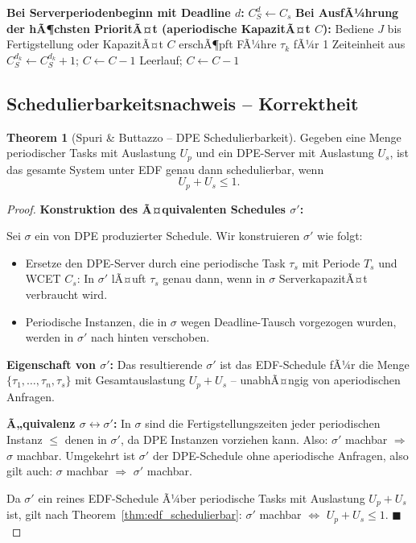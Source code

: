 ﻿\documentclass[a4paper,12pt]{report}
\theoremstyle{definition}
\newtheorem{theorem}{Theorem}[chapter]
\begin{document}
\begin{algorithm}[H]
	\caption{DPE Server -- Ereignisbehandlung}
	\begin{algorithmic}[1]
		\State \textbf{Bei Serverperiodenbeginn mit Deadline $d$:}
		\State $C_S^d \leftarrow C_s$
		\State
		\State \textbf{Bei AusfÃ¼hrung der hÃ¶chsten PrioritÃ¤t (aperiodische KapazitÃ¤t $C$):}
		\State Bediene $J$ bis Fertigstellung oder KapazitÃ¤t $C$ erschÃ¶pft
		\State FÃ¼hre $\tau_k$ fÃ¼r 1 Zeiteinheit aus
		\State $C_S^{d_k} \leftarrow C_S^{d_k} + 1$; $C \leftarrow C - 1$
		\Else
		\State Leerlauf; $C \leftarrow C - 1$
		\EndIf
	\end{algorithmic}
\end{algorithm}

\subsection{Schedulierbarkeitsnachweis -- Korrektheit}

\begin{theorem}[Spuri \& Buttazzo -- DPE Schedulierbarkeit]
	\label{thm:dpe}
	Gegeben eine Menge periodischer Tasks mit Auslastung $U_p$ und ein DPE-Server
	mit Auslastung $U_s$, ist das gesamte System unter EDF genau dann schedulierbar,
	wenn
	\[
		U_p + U_s \leq 1.
	\]
\end{theorem}

\begin{proof}
	\textbf{Konstruktion des Ã¤quivalenten Schedules $\sigma'$:}

	Sei $\sigma$ ein von DPE produzierter Schedule. Wir konstruieren $\sigma'$
	wie folgt:
	\begin{itemize}
		\item Ersetze den DPE-Server durch eine periodische Task $\tau_s$
		      mit Periode $T_s$ und WCET $C_s$: In $\sigma'$ lÃ¤uft $\tau_s$ genau dann,
		      wenn in $\sigma$ ServerkapazitÃ¤t verbraucht wird.
		\item Periodische Instanzen, die in $\sigma$ wegen Deadline-Tausch
		      vorgezogen wurden, werden in $\sigma'$ nach hinten verschoben.
	\end{itemize}

	\textbf{Eigenschaft von $\sigma'$:} Das resultierende $\sigma'$ ist das
	EDF-Schedule fÃ¼r die Menge $\{\tau_1,\ldots,\tau_n,\tau_s\}$ mit
	Gesamtauslastung $U_p + U_s$ -- unabhÃ¤ngig von aperiodischen Anfragen.

	\textbf{Ã„quivalenz $\sigma \leftrightarrow \sigma'$:} In $\sigma$ sind die
	Fertigstellungszeiten jeder periodischen Instanz $\leq$ denen in $\sigma'$,
	da DPE Instanzen vorziehen kann. Also: $\sigma'$ machbar $\Rightarrow$ $\sigma$
	machbar. Umgekehrt ist $\sigma'$ der DPE-Schedule ohne aperiodische Anfragen,
	also gilt auch: $\sigma$ machbar $\Rightarrow$ $\sigma'$ machbar.

	Da $\sigma'$ ein reines EDF-Schedule Ã¼ber periodische Tasks mit Auslastung
	$U_p + U_s$ ist, gilt nach Theorem~\ref{thm:edf_schedulierbar}:
	$\sigma'$ machbar $\iff$ $U_p + U_s \leq 1$. \hfill$\blacksquare$
\end{proof}
\end{document}
